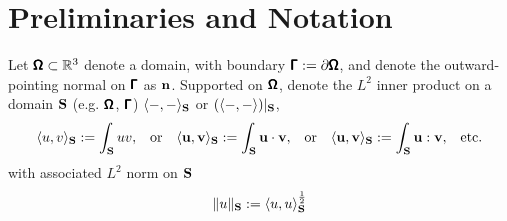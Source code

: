 \section*{Preliminaries and Notation}

    Let $\pmb{\mathsf{\Omega}}  \subset  \mathbb{R}^{3}$ denote a  domain, with boundary $\pmb{\mathsf{\Gamma}}  :=  \partial\pmb{\mathsf{\Omega}}$, and denote the outward-pointing normal on $\pmb{\mathsf{\Gamma}}$ as $\mathbf{n}$. Supported on $\pmb{\mathsf{\Omega}}$, denote the $L^{2}$ inner product on a domain $\mathbf{S}$ (e.g. $\pmb{\mathsf{\Omega}}$, $\pmb{\mathsf{\Gamma}}$) $\langle-, -\rangle_{\mathbf{S}}$ or $(\langle-, -\rangle)|_{\mathbf{S}}$,
    \begin{align}
        \langle u, v\rangle_{\mathbf{S}}  :=  \int_{\mathbf{S}}uv,  &&
        \text{or}  &&
        \langle \mathbf{u}, \mathbf{v}\rangle_{\mathbf{S}}  :=  \int_{\mathbf{S}}\mathbf{u}\cdot\mathbf{v},  &&
        \text{or}  &&
        \langle \mathbf{u}, \mathbf{v}\rangle_{\mathbf{S}}  :=  \int_{\mathbf{S}}\mathbf{u}:\mathbf{v},  &&
        \text{etc.}
    \end{align}
    with associated $L^{2}$ norm on $\mathbf{S}$
    \begin{equation}
        \|u\|_{\mathbf{S}}  :=  \langle u, u\rangle_{\mathbf{S}}^{\frac{1}{2}}
    \end{equation}
    
